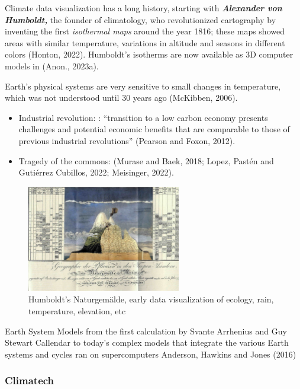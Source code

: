 \documentclass[
  letterpaper,
  DIV=11,
  numbers=noendperiod]{scrartcl}
\providecommand{\tightlist}{%
  \setlength{\itemsep}{0pt}\setlength{\parskip}{0pt}}\usepackage{longtable,booktabs,array}
\begin{document}
Climate data visualization has a long history, starting with
\textbf{\emph{Alexander von Humboldt,}} the founder of climatology, who
revolutionized cartography by inventing the first \emph{isothermal maps}
around the year 1816; these maps showed areas with similar temperature,
variations in altitude and seasons in different colors (Honton, 2022).
Humboldt's isotherms are now available as 3D computer models in (Anon.,
2023a).

Earth's physical systems are very sensitive to small changes in
temperature, which was not understood until 30 years ago (McKibben,
2006).

\begin{itemize}
\tightlist
\item
  Industrial revolution: : ``transition to a low carbon economy presents
  challenges and potential economic benefits that are comparable to
  those of previous industrial revolutions'' (Pearson and Foxon, 2012).
\item
  Tragedy of the commons: (Murase and Baek, 2018; Lopez, Pastén and
  Gutiérrez Cubillos, 2022; Meisinger, 2022).
\end{itemize}

\begin{figure}[H]

{\centering \includegraphics[width=0.6\textwidth,height=\textheight]{./images/humboldt.jpg}

}

\caption{Humboldt's Naturgemälde, early data visualization of ecology,
rain, temperature, elevation, etc}

\end{figure}%

Earth System Models from the first calculation by Svante Arrhenius and
Guy Stewart Callendar to today's complex models that integrate the
various Earth systems and cycles ran on supercomputers Anderson, Hawkins
and Jones (2016)

\subsubsection{Climatech}\label{climatech}
\end{document}

